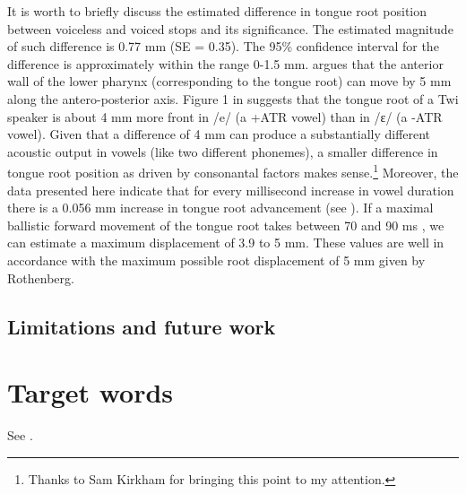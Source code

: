 \documentclass[12pt,]{article}
\let\rmarkdownfootnote\footnote%
\def\footnote{\protect\rmarkdownfootnote}
\begin{document}
It is worth to briefly discuss the estimated difference in tongue root
position between voiceless and voiced stops and its significance. The
estimated magnitude of such difference is 0.77 mm (SE = 0.35). The 95\%
confidence interval for the difference is approximately within the range
0-1.5 mm. \citet{rothenberg1967} argues that the anterior wall of the
lower pharynx (corresponding to the tongue root) can move by 5 mm along
the antero-posterior axis. Figure 1 in \citet{kirkham2017} suggests that
the tongue root of a Twi speaker is about 4 mm more front in /e/ (a +ATR
vowel) than in /ɛ/ (a -ATR vowel). Given that a difference of 4 mm can
produce a substantially different acoustic output in vowels (like two
different phonemes), a smaller difference in tongue root position as
driven by consonantal factors makes
sense.\footnote{Thanks to Sam Kirkham for bringing this point to my attention.}
Moreover, the data presented here indicate that for every millisecond
increase in vowel duration there is a 0.056 mm increase in tongue root
advancement (see ). If a maximal ballistic forward
movement of the tongue root takes between 70 and 90 ms
\citep{rothenberg1967}, we can estimate a maximum displacement of 3.9 to
5 mm. These values are well in accordance with the maximum possible root
displacement of 5 mm given by Rothenberg.

\subsection{Limitations and future
work}\label{limitations-and-future-work}

\appendix

\section{Target words}\label{target-words}

\label{a:targets}

See .



\end{document}
